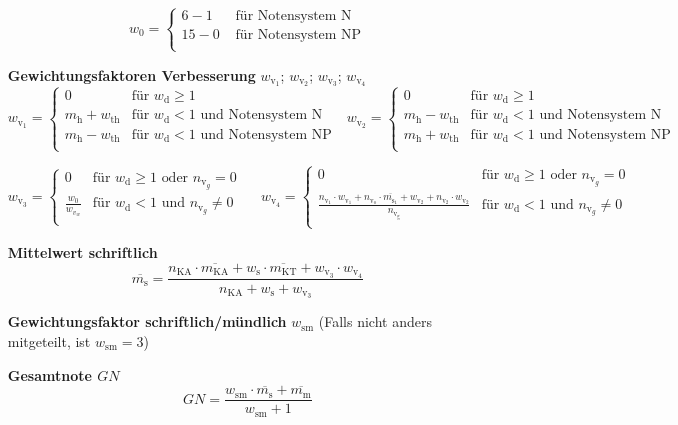 \begin{enumerate}[label=\textbf{\textbullet}, align=left, leftmargin=*]
\[	w_{0} =
	\begin{cases}
		6-1 & \text{ für Notensystem N} \\
		15 - 0 & \text{ für Notensystem NP} \\
	\end{cases}
	\]
	\item[\textbf{Gewichtungsfaktoren Verbesserung}] $w_{\mathrm{v}_1}$; $w_{\mathrm{v}_2}$; $w_{\mathrm{v}_3}$; $w_{\mathrm{v}_4}$
	\[
	w_{\mathrm{v}_1} =
	\begin{cases}
		0 & \text{für }  w_{\mathrm{d}} \geq 1 \\
		m_{\mathrm{h}} + w_{\mathrm{th}} & \text{für }    w_{\mathrm{d}} < 1 \text{ und Notensystem N} \\
		m_{\mathrm{h}} - w_{\mathrm{th}} & \text{für }    w_{\mathrm{d}} < 1 \text{ und Notensystem NP} \\
	\end{cases}
	\,\,\,\,
	w_{\mathrm{v}_2} =
	\begin{cases}
		0 & \text{für }  w_{\mathrm{d}} \geq 1 \\
		m_{\mathrm{h}} - w_{\mathrm{th}} & \text{für }    w_{\mathrm{d}} < 1 \text{ und Notensystem N} \\
		m_{\mathrm{h}} + w_{\mathrm{th}} & \text{für }    w_{\mathrm{d}} < 1 \text{ und Notensystem NP} \\
	\end{cases}
	\]
	
	\[
	w_{\mathrm{v}_3} =
	\begin{cases}
		0 & \text{für }  w_{\mathrm{d}} \geq 1 \text{ oder } n_{\mathrm{v}_g}=0 \\
		\frac{w_{0}}{w_{v_w}} & \text{für }    w_{\mathrm{d}} < 1 \text{ und } n_{\mathrm{v}_g} \neq 0 \\
	\end{cases}
	\,\,\,\,\,\,\,\,
	w_{\mathrm{v}_4} =
	\begin{cases}
		0 & \text{für }  w_{\mathrm{d}} \geq 1 \text{ oder } n_{\mathrm{v}_g}=0 \\
		\frac{n_{\mathrm{v}_1} \cdot w_{\mathrm{v}_1} + n_{\mathrm{v}_\mathrm{o}} \cdot \overline{m_{\mathrm{s}_1}} + w_{\mathrm{v}_2} + n_{\mathrm{v}_2} \cdot w_{\mathrm{v}_2}}{n_{\mathrm{v}_\mathrm{g}}} & \text{für }    w_{\mathrm{d}} < 1 \text{ und } n_{\mathrm{v}_g} \neq 0 \\
	\end{cases}
	\]	
	\item[\textbf{Mittelwert schriftlich}]
	\vspace{-0.3cm}
	\[
	\overline{m_{\mathrm{s}}} = \frac{ n_{\mathrm{KA}} \cdot \overline{m_{\mathrm{KA}}} + w_{\mathrm{s}} \cdot \overline{m_{\mathrm{KT}}} +w_{\mathrm{v}_3} \cdot w_{\mathrm{v}_4}   }{n_{\mathrm{KA}} + w_{\mathrm{s}} + w_{\mathrm{v}_3}}
	\]
	\item[\textbf{Gewichtungsfaktor schriftlich/mündlich}] $w_{\mathrm{sm}}$ (Falls nicht anders mitgeteilt, ist $w_{\mathrm{sm}}=3$)
	\item[\textbf{Gesamtnote $GN$}]
	\[
	GN = \frac{w_{\mathrm{sm}} \cdot \overline{m_{\mathrm{s}}} + \overline{m_{\mathrm{m}}}}{w_{\mathrm{sm}}+1}
	\]
\end{enumerate}

